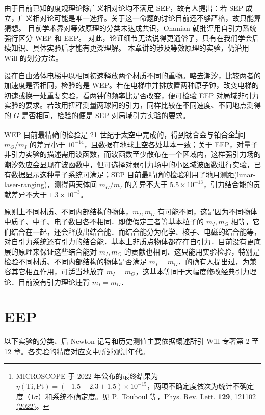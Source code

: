 由于目前已知的度规理论除广义相对论均不满足 SEP，故有人提出：若 SEP 成立，广义相对论可能是唯一选择。关于这一命题的讨论目前还不够严格，故只能算猜想。
目前学术界对等效原理的分类未达成共识，Ohanian\cite{Ohanian} 就批评用自引力系统强行区分 WEP 和 EEP。
对此，论证细节无法说得更通俗了，只有在我们学会后续知识、具体实验后才能有更深理解。
本章讲的涉及等效原理的实验，仍沿用 Will 的划分方法。

设在自由落体电梯中以相同初速释放两个材质不同的重物。略去潮汐，比较两者的加速度是否相同，检验的是 WEP。若在电梯中并排放置两种原子钟，改变电梯的初速或换一处重复实验，看两钟的频率比是否改变，便可检验 EEP 对局域非引力实验的要求。若改用扭秤测量两球间的引力，同样比较在不同速度、不同地点测得的 $G$ 是否相同，检验的便是 SEP 对局域引力实验的要求。

WEP 目前最精确的检验是 21 世纪于太空中完成的，得到钛合金与铂合金\footnote{MICROSCOPE 于 2022 年公布的最终结果为 $\eta(\mathrm{Ti},\mathrm{Pt})=(-1.5\pm2.3\pm1.5)\times10^{-15}$，两项不确定度依次为统计不确定度（$1\sigma$）和系统不确定度。见 P.~Touboul 等，\href{https://doi.org/10.1103/PhysRevLett.129.121102}{Phys. Rev. Lett. \textbf{129}, 121102 (2022)}。}间 $m_G/m_I$ 的差异小于 $10^{-14}$，且数据在地球上空各处基本一致；关于 EEP，对量子非引力实验的描述需用波函数，而波函数至少散布在一个区域内，这样强引力场的潮汐效应会显现在波函数中，但可选择对弱引力场中的小区域波函数进行实验，已有数据显示这种量子系统可满足；SEP 目前最精确的检验利用了地月测距(lunar-laser-ranging)，测得两天体间 $m_G/m_I$ 的差异不大于 $5.5\times 10^{-13}$，引力结合能的贡献差异不大于 $1.3\times 10^{-3}$。

原则上不同材质、不同内部结构的物体，$m_I,m_G$ 有可能不同，这是因为不同物体中质子、中子、电子数目各不相同．即使假定三者等基本粒子的 $m_I,m_G$ 相等，它们结合在一起，还会释放出结合能．而结合能分为化学、核子、电磁的结合能等，对自引力系统还有引力的结合能．基本上非质点物体都存在自引力．目前没有更底层的原理来保证这些结合能对 $m_I,m_G$ 的贡献也相同．这只能用实验检验，特别是检验不同材质、不同内部结构的物体是否满足 $m_I=m_G$．的确有人提出过，为兼容其它相互作用，可适当地放弃 $m_I=m_G$，这基本等同于大幅度修改经典引力理论．目前没有引力理论违背 $m_I=m_G$．

\section{EEP}\label{sec:exp-eep}

以下实验的分类、后 Newton 记号和历史测值主要依据概述所引 Will 专著第 2 至 12 章。各实验的精度对应文中所述观测年代。

